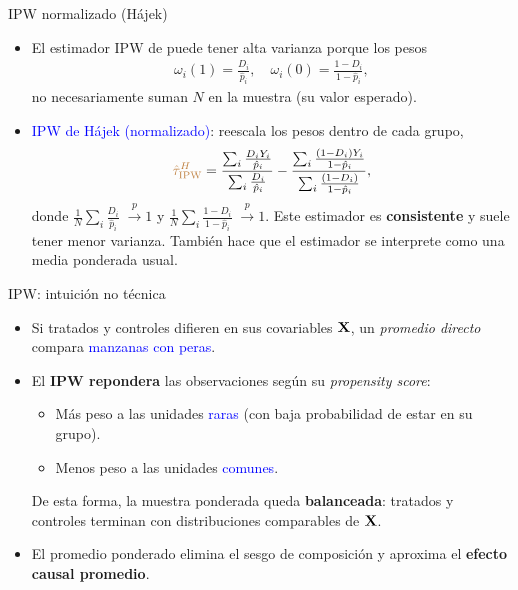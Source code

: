 \documentclass[10pt, xcolor=dvipsnames]{beamer}
\begin{document}
\begin{frame}{IPW normalizado (Hájek)}
\begin{itemize}
  \item El estimador IPW de \citet{horvitz1952} puede tener alta varianza porque los pesos
  \begin{align*}
      \omega_i(1) = \frac{D_i}{\hat p_i}, \quad \omega_i(0) = \frac{1-D_i}{1-\hat p_i},
  \end{align*}
  no necesariamente suman \(N\) en la muestra (su valor esperado). %
  \vspace{0.5em}
  \item \textcolor{blue}{IPW de Hájek (normalizado)}: reescala los pesos dentro de cada grupo,
  \begin{align*}     
    \textcolor{brown}{\hat\tau_{\text{IPW}}^{H}} 
    = 
    \frac{\sum_{i} \frac{D_i Y_i}{\hat p_i}}
                      {\sum_{i} \frac{D_i}{\hat p_i}}
    -
    \frac{\sum_{i} \frac{(1-D_i) Y_i}{1-\hat p_i}}
                      {\sum_{i} \frac{(1-D_i)}{1-\hat p_i}},
  \end{align*}
  donde \(\frac{1}{N}\sum_i \frac{D_i}{\hat p_i} \;\xrightarrow{p} 1\) y \(\frac{1}{N}\sum_i \frac{1-D_i}{1 -\hat p_i} \;\xrightarrow{p} 1\). Este estimador es \textbf{consistente} y suele tener menor varianza. También hace que el estimador se interprete como una media ponderada usual.
\end{itemize}
\end{frame}


\begin{frame}{IPW: intuición no técnica}
\begin{itemize}
  \item Si tratados y controles difieren en sus covariables \(\textbf{X}\), un \textit{promedio directo} compara \textcolor{blue}{manzanas con peras}. %
  \vspace{1em}
  \item El \textbf{IPW repondera} las observaciones según su \textit{propensity score}:
  \smallspace
  \begin{itemize}
    \item Más peso a las unidades \textcolor{blue}{raras} (con baja probabilidad de estar en su grupo).
    \item Menos peso a las unidades \textcolor{blue}{comunes}. %
  \end{itemize}
  \vspace{1em}
  De esta forma, la muestra ponderada queda \textbf{balanceada}: tratados y controles terminan con distribuciones comparables de \(\textbf{X}\). %
  \vspace{1em}
  \item El promedio ponderado elimina el sesgo de composición y aproxima el \textbf{efecto causal promedio}.
\end{itemize}
\end{frame}
\end{document}
